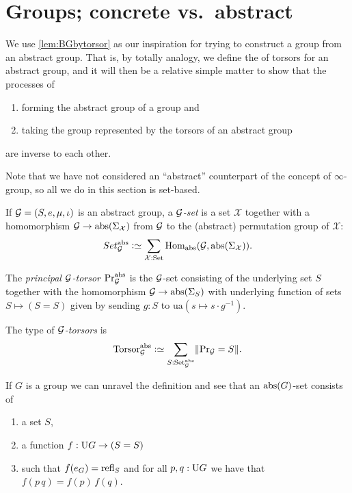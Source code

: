 \section{Groups; concrete vs.~abstract%
}
\label{sec:Gsetforabstract}

We use \cref{lem:BGbytorsor} as our inspiration for trying to construct a group from an abstract group.
That is, by totally analogy, we define the of torsors for an abstract group,
and it will then be a relative simple matter to show that the processes of
\begin{enumerate}
\item forming the abstract group of a group and 
\item taking the group represented by the torsors of an abstract group
\end{enumerate}
 are inverse to each other.

Note that we have not considered an ``abstract'' counterpart of the concept of $\infty$-group, so all we do in this section is set-based.

\begin{definition}
\label{def:abstrGtorsors}
  If ${\mathcal G}=(S,e,\mu,\iota)$ is an abstract group, a \emph{$\mathcal G$-set} is a set $\mathcal X$ together with a homomorphism
$\mathcal G\to\mathrm{abs}(\Sigma_{\mathcal X})$
from $\mathcal G$ to the (abstract) permutation group of $\mathcal X$:
$$Set_{\agp G}^\abstr\defequi \sum_{\mathcal X:\Set}\Hom_\abstr({\agp G},\abstr(\Sigma_{\mathcal X})).$$

The \emph{principal ${\mathcal G}$-torsor} $\mathrm{Pr}_{{\mathcal G}}^{\mathrm{abs}}$ is the ${\mathcal G}$-set consisting of the underlying set $S$ together with the homomorphism ${\mathcal G}\to\mathrm{abs}(\Sigma_{S})$ with underlying function of sets $S\mapsto (S=S)$ given by sending $g:S$ to $\mathrm{ua}(s\mapsto s\cdot g^{-1})$.

The type of \emph{${\mathcal G}$-torsors} is
$$\typetorsor_{\agp G}^\abstr\defequi\sum_{S:\Set_{\agp G}^\abstr}\Trunc{\princ {\agp G}=S}.$$
\end{definition}
\begin{example}
  If $G$ is a group we can unravel the definition and see that an $\mathrm{abs}(G)$-set consists of
  \begin{enumerate}
  \item a set $S$, 
  \item a function $f:\mathrm{U} G\to (S=S)$ 
  \item such that $f(e_G)=\refl{S}$ and for all $p,q:\mathrm{U} G$ we have that $f(p\, q)=f(p)\,f(q)$.
  \end{enumerate}

\end{example}


